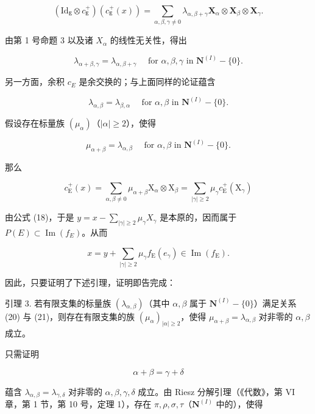 \[
(\mathrm{Id} _ {\mathtt {E}} \otimes c _ {\mathtt {E}} ^ {+}) (c _ {\mathtt {E}} ^ {+} (x)) = \sum_ {\alpha , \beta , \gamma \neq 0} \lambda_ {\alpha , \beta + \gamma} \mathbf {X} _ {\alpha} \otimes \mathbf {X} _ {\beta} \otimes \mathbf {X} _ {\gamma}.
\]

由第 1 号命题 3 以及诸 \(X_{\alpha}\) 的线性无关性，得出

\[
\lambda_ {\alpha + \beta , \gamma} = \lambda_ {\alpha , \beta + \gamma} \quad \text { for } \alpha , \beta , \gamma \text { in } \mathbf {N} ^ {(I)} - \{0 \}.\tag{20}
\]

另一方面，余积 \(c_{E}\) 是余交换的；与上面同样的论证蕴含

\[
\lambda_ {\alpha , \beta} = \lambda_ {\beta , \alpha} \quad \text { for } \alpha , \beta \text { in } \mathbf {N} ^ {(I)} - \{0 \}.\tag{21}
\]

假设存在标量族 \((\mu_{\alpha})\)（\(|\alpha| \geqslant 2\)），使得

\[
\mu_ {\alpha + \beta} = \lambda_ {\alpha , \beta} \quad \text { for } \alpha , \beta \text { in } \mathbf {N} ^ {(I)} - \{0 \}.\tag{22}
\]

那么

\[
c _ {\mathrm{E}} ^ {+} (x) = \sum_ {\alpha , \beta \neq 0} \mu_ {\alpha + \beta} \mathrm{X} _ {\alpha} \otimes \mathrm{X} _ {\beta} = \sum_ {| \gamma | \geqslant 2} \mu_ {\gamma} c _ {\mathrm{E}} ^ {+} (\mathrm{X} _ {\gamma})
\]

由公式 (18)，于是 \(y = x - \sum_{|\gamma| \geq 2} \mu_\gamma X_\gamma\) 是本原的，因而属于 \(P(E) \subset \operatorname{Im}(f_E)\)。从而

\[
x = y + \sum_ {| \gamma | \geqslant 2} \mu_ {\gamma} f _ {\mathrm{E}} (e _ {\gamma}) \in \operatorname{Im} (f _ {\mathrm{E}}).
\]

因此，只要证明了下述引理，证明即告完成：

引理 3. 若有限支集的标量族 \((\lambda_{\alpha, \beta})\)（其中 \(\alpha, \beta\) 属于 \(\mathbf{N}^{(I)} - \{0\}\)）满足关系 (20) 与 (21)，则存在有限支集的族 \((\mu_{\alpha})_{|\alpha| \geqslant 2}\)，使得 \(\mu_{\alpha + \beta} = \lambda_{\alpha, \beta}\) 对非零的 \(\alpha, \beta\) 成立。

只需证明

\[
\alpha + \beta = \gamma + \delta\tag{23}
\]

蕴含 \(\lambda_{\alpha, \beta} = \lambda_{\gamma, \delta}\) 对非零的 \(\alpha, \beta, \gamma, \delta\) 成立。由 Riesz 分解引理（《代数》，第 VI 章，第 1 节，第 10 号，定理 1），存在 \(\pi, \rho, \sigma, \tau\)（\(\mathbf{N}^{(I)}\) 中的），使得


